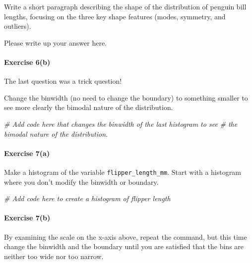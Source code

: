 \documentclass[
]{book}
\newenvironment{Shaded}{\begin{snugshade}}{\end{snugshade}}
\newcommand{\CommentTok}[1]{\textcolor[rgb]{0.56,0.35,0.01}{\textit{#1}}}
\begin{document}
Write a short paragraph describing the shape of the distribution of penguin bill lengths, focusing on the three key shape features (modes, symmetry, and outliers).

Please write up your answer here.

\hypertarget{exercise-6b-1}{%
\paragraph*{Exercise 6(b)}\label{exercise-6b-1}}

The last question was a trick question!

Change the binwidth (no need to change the boundary) to something smaller to see more clearly the bimodal nature of the distribution.

\begin{Shaded}
\begin{Highlighting}[]
\CommentTok{\# Add code here that changes the binwidth of the last histogram to see}
\CommentTok{\# the bimodal nature of the distribution.}
\end{Highlighting}
\end{Shaded}

\hypertarget{exercise-7a-1}{%
\paragraph*{Exercise 7(a)}\label{exercise-7a-1}}

Make a histogram of the variable \texttt{flipper\_length\_mm}. Start with a histogram where you don't modify the binwidth or boundary.

\begin{Shaded}
\begin{Highlighting}[]
\CommentTok{\# Add code here to create a histogram of flipper length}
\end{Highlighting}
\end{Shaded}

\hypertarget{exercise-7b-1}{%
\paragraph*{Exercise 7(b)}\label{exercise-7b-1}}

By examining the scale on the x-axis above, repeat the command, but this time change the binwidth and the boundary until you are satisfied that the bins are neither too wide nor too narrow.
\end{document}

